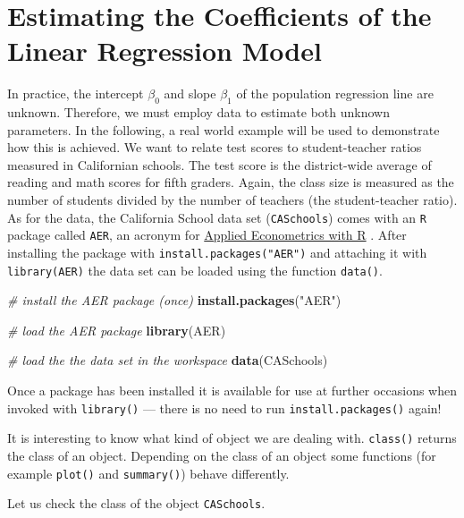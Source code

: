 \documentclass[]{book}
\newenvironment{Shaded}{\begin{snugshade}}{\end{snugshade}}
\newcommand{\KeywordTok}[1]{\textcolor[rgb]{0.13,0.29,0.53}{\textbf{#1}}}
\newcommand{\StringTok}[1]{\textcolor[rgb]{0.31,0.60,0.02}{#1}}
\newcommand{\CommentTok}[1]{\textcolor[rgb]{0.56,0.35,0.01}{\textit{#1}}}
\newcommand{\NormalTok}[1]{#1}
\theoremstyle{definition}
\theoremstyle{definition}
\theoremstyle{definition}
\theoremstyle{remark}
\begin{document}
\section{Estimating the Coefficients of the Linear Regression
Model}\label{estimating-the-coefficients-of-the-linear-regression-model}

In practice, the intercept \(\beta_0\) and slope \(\beta_1\) of the
population regression line are unknown. Therefore, we must employ data
to estimate both unknown parameters. In the following, a real world
example will be used to demonstrate how this is achieved. We want to
relate test scores to student-teacher ratios measured in Californian
schools. The test score is the district-wide average of reading and math
scores for fifth graders. Again, the class size is measured as the
number of students divided by the number of teachers (the
student-teacher ratio). As for the data, the California School data set
(\texttt{CASchools}) comes with an \texttt{R} package called
\texttt{AER}, an acronym for
\href{https://cran.r-project.org/web/packages/AER/AER.pdf}{Applied
Econometrics with R} \citep{R-AER}. After installing the package with
\texttt{install.packages("AER")} and attaching it with
\texttt{library(AER)} the data set can be loaded using the function
\texttt{data()}.

\begin{Shaded}
\begin{Highlighting}[]
\CommentTok{# install the AER package (once)}
\KeywordTok{install.packages}\NormalTok{(}\StringTok{"AER"}\NormalTok{)}

\CommentTok{# load the AER package }
\KeywordTok{library}\NormalTok{(AER)   }

\CommentTok{# load the the data set in the workspace}
\KeywordTok{data}\NormalTok{(CASchools) }
\end{Highlighting}
\end{Shaded}

Once a package has been installed it is available for use at further
occasions when invoked with \texttt{library()} --- there is no need to
run \texttt{install.packages()} again!

It is interesting to know what kind of object we are dealing with.
\texttt{class()} returns the class of an object. Depending on the class
of an object some functions (for example \texttt{plot()} and
\texttt{summary()}) behave differently.

Let us check the class of the object \texttt{CASchools}.
\end{document}
